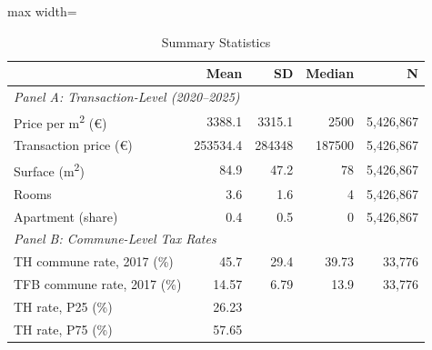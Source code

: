 \begin{table}[htbp]
\centering
\caption{Summary Statistics}
\label{tab:summary}
\begin{adjustbox}{max width=\textwidth}
\begin{tabular}{lrrrr}
\toprule
& Mean & SD & Median & N \\
\midrule
\multicolumn{5}{l}{\textit{Panel A: Transaction-Level (2020--2025)}} \\
Price per m\textsuperscript{2} (\euro{}) & 3388.1 & 3315.1 & 2500 & 5,426,867 \\
Transaction price (\euro{}) & 253534.4 & 284348 & 187500 & 5,426,867 \\
Surface (m\textsuperscript{2}) & 84.9 & 47.2 & 78 & 5,426,867 \\
Rooms & 3.6 & 1.6 & 4 & 5,426,867 \\
Apartment (share) & 0.4 & 0.5 & 0 & 5,426,867 \\
\midrule
\multicolumn{5}{l}{\textit{Panel B: Commune-Level Tax Rates}} \\
TH commune rate, 2017 (\%) & 45.7 & 29.4 & 39.73 & 33,776 \\
TFB commune rate, 2017 (\%) & 14.57 & 6.79 & 13.9 & 33,776 \\
TH rate, P25 (\%) & 26.23 &  &  &  \\
TH rate, P75 (\%) & 57.65 &  &  &  \\
\bottomrule
\end{tabular}
\end{adjustbox}
\end{table}
